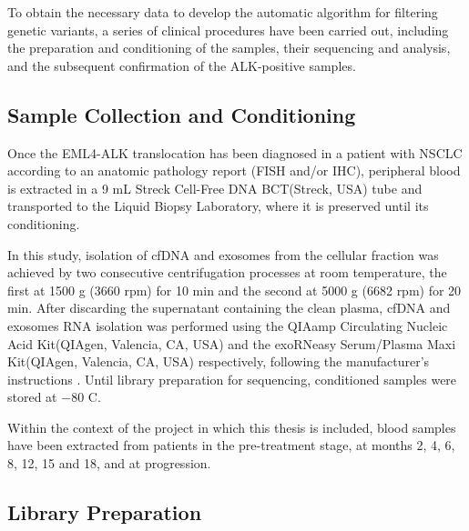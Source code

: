 To obtain the necessary data to develop the automatic algorithm for filtering genetic variants, a series of clinical procedures have been carried out, including the preparation and conditioning of the samples, their sequencing and analysis, and the subsequent confirmation of the ALK-positive samples.

\subsection{Sample Collection and Conditioning}

Once the EML4-ALK translocation has been diagnosed in a patient with NSCLC according to an anatomic pathology report (FISH and\slash or IHC), peripheral blood is extracted in a 9 mL Streck Cell-Free DNA BCT\textsuperscript\textregistered (Streck, USA) tube and transported to the Liquid Biopsy Laboratory, where it is preserved until its conditioning.

In this study, isolation of cfDNA and exosomes from the cellular fraction was achieved by two consecutive centrifugation processes at room temperature, the first at 1500 g (3660 rpm) for 10 min and the second at 5000 g (6682 rpm) for 20 min. After discarding the supernatant containing the clean plasma, cfDNA and exosomes RNA isolation was performed using the QIAamp Circulating Nucleic Acid Kit\textsuperscript\textregistered (QIAgen, Valencia, CA, USA) and the exoRNeasy Serum/Plasma Maxi Kit\textsuperscript\textregistered (QIAgen, Valencia, CA, USA) respectively, following the manufacturer's instructions \cite{QUIAGEN_cfDNA, QUIAGEN_exosomes}. Until library preparation for sequencing, conditioned samples were stored at $-80$ \textdegree C.

Within the context of the project in which this thesis is included, blood samples have been extracted from patients in the pre-treatment stage, at months 2, 4, 6, 8, 12, 15 and 18, and at progression.

\subsection{Library Preparation}


